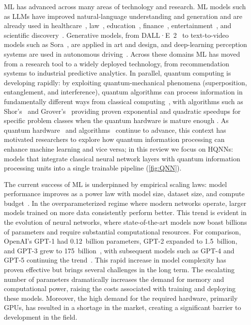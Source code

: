\documentclass[aps,10pt,groupedaddress,prx,superscriptaddress,twocolumn,balancelastpage, tightenlines]{revtex4-2}
\theoremstyle{plain}  %
\begin{document}
\Gls{ML} has advanced across many areas of technology and research. \gls{ML} models such as LLMs have improved natural-language understanding and generation and are already used in healthcare~\cite{Ayers2023ChatGPTJAMA}, law~\cite{Liu2023LegalBench}, education~\cite{Carvallo2023ChatGPT}, finance~\cite{Cao2024QuantAI}, entertainment~\cite{Covington2016YouTube}, and scientific discovery~\cite{Jumper2021AlphaFold, yamada2025aiscientist}. Generative models, from DALL·E~2~\cite{Ramesh2022Dalle2} to text-to-video models such as Sora~\cite{openai2024sora}, are applied in art and design, and deep-learning perception systems are used in autonomous driving~\cite{Badue2021Survey}. Across these domains \gls{ML} has moved from a research tool to a widely deployed technology, from recommendation systems to industrial predictive analytics. In parallel, quantum computing is developing rapidly: by exploiting quantum-mechanical phenomena (superposition, entanglement, and interference), quantum algorithms can process information in fundamentally different ways from classical computing~\cite{Nielsen2011Quantum}, with algorithms such as Shor's~\cite{Shor1997Polynomial} and Grover's~\cite{grover1996fast} providing proven exponential and quadratic speedups for specific problem classes when the quantum hardware is mature enough \cite{Aaronson2015Complexity}. 
As quantum hardware~\cite{Preskill2018Quantum, arute2019quantum} and algorithms~\cite{Biamonte2017QML} continue to advance, this context has motivated researchers to explore how quantum information processing can enhance machine learning and vice versa; in this review we focus on \glspl{HQNN}: models that integrate classical neural network layers with quantum information processing units into a single trainable pipeline (\autoref{fig:QNN}).



The current success of \gls{ML} is underpinned by empirical scaling laws: model performance improves as a power law with model size, dataset size, and compute budget~\cite{kaplan2020scaling, nakkiran2021deep}. In the overparameterized regime where modern networks operate, larger models trained on more data consistently perform better. This trend is evident
in the evolution of neural networks, where state-of-the-art models now boast
billions of parameters and require substantial computational resources. For
comparison, OpenAI's GPT-1 had 0.12~billion parameters, GPT-2 expanded
to 1.5~billion, and GPT-3 grew to
175~billion~\cite{radford2018gpt1, radford2019gpt2, brown2020gpt3},
with subsequent models such as GPT-4 and GPT-5 continuing the
trend~\cite{openai2024gpt4, openai2025gpt5}. This rapid increase in model
complexity has proven effective but brings several challenges in the long
term. The escalating number of parameters dramatically increases the demand
for memory and computational power, raising the costs associated with training
and deploying these models. Moreover, the high demand for the required
hardware, primarily GPUs, has resulted in a shortage in the market, creating a significant barrier to development in the field.
\end{document}
